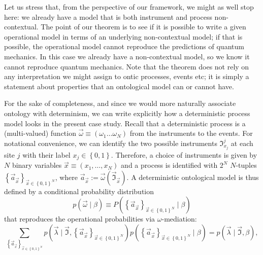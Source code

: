 \documentclass[a4paper,onecolumn,11pt,accepted=2018-05-04]{quantumarticle}
\begin{document}
Let us stress that, from the perspective of our framework, we might as well stop here: we already have a model that is both instrument and process non-contextual. The point of our theorem is to see if it is possible to write a given operational model in terms of an underlying non-contextual model; if that is possible, the operational model cannot reproduce the predictions of quantum mechanics. In this case we already have a non-contextual model, so we know it cannot reproduce quantum mechanics. Note that the theorem does not rely on any interpretation we might assign to ontic processes, events etc; it is simply a statement about properties that an ontological model can or cannot have. 

For the sake of completeness, and since we would more naturally associate ontology with determinism,  we can write explicitly how a deterministic process model looks in the present case study.
Recall that a deterministic process is a (multi-valued) function $\vec{\omega}\equiv \left(\omega_1\dots \omega_N\right)$  from the instruments to the events. For notational convenience, we can identify the two possible instruments $\mathfrak{I}^j_{x_j}$ at each site $j$ with their label $x_j\in\left\{0,1\right\}$. Therefore, a choice of instruments is given by $N$ binary variables $\vec{x}\equiv\left(x_1,\dots,x_N\right)$ and a process is identified with $2^N$ $N$-tuples $\left\{\vec{a}_{\vec{x}}\right\}_{\vec{x}\in \left\{0,1\right\}^N}$, where $\vec{a}_{\vec{x}}:= \vec{\omega}(\vec{\mathfrak{I}}_{\vec{x}})$. 
A deterministic ontological model is thus defined by a conditional probability distribution 
\begin{equation}
p\left(\vec{\omega}\mid\beta\right)\equiv P\left(\left\{\vec{a}_{\vec{x}}\right\}_{\vec{x}\in \left\{0,1\right\}^N} \mid\beta\right)
\end{equation} 
that reproduces the operational probabilities via $\omega$-mediation:
\begin{equation}
\sum_{\left\{\vec{a}_{\vec{x}}\right\}_{\vec{x}\in \left\{0,1\right\}^N} }
p\left(\vec{\lambda}\mid \vec{\mathfrak{I}}, \left\{\vec{a}_{\vec{x}}\right\}_{\vec{x}\in \left\{0,1\right\}^N}\right) p(\left\{\vec{a}_{\vec{x}}\right\}_{\vec{x}\in \left\{0,1\right\}^N} \mid \beta) 
= p\left(\vec{\lambda}\mid \vec{\mathfrak{I}}, \beta\right),
\label{omegasep}
\end{equation}
%
\end{document}
